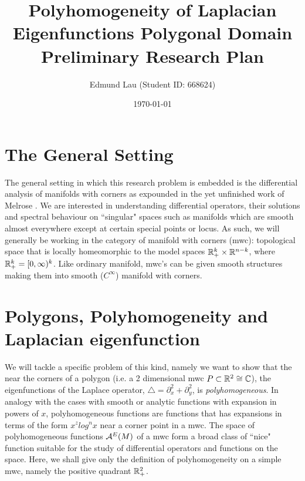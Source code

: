 \documentclass{article}
\title{Polyhomogeneity of Laplacian Eigenfunctions Polygonal Domain \\  Preliminary Research Plan}
\author{Edmund Lau  (Student ID: 668624)}
\date{\today}
\begin{document}
\maketitle



\section{The General Setting}
The general setting in which this research problem is embedded is the differential analysis of manifolds with corners as expounded in the yet unfinished work of Melrose \cite{rbm_daomwc}. We are interested in understanding differential operators, their solutions and spectral behaviour on ``singular" spaces such as manifolds which are smooth almost everywhere except at certain special points or locus. As such, we will generally be working in the category of manifold with corners (mwc): topological space that is locally homeomorphic to the model spaces $\mathbb R_+^{k} \times \mathbb R^{n - k}$, where $\mathbb R_+^k = [0, \infty)^k$. Like ordinary manifold, mwc's can be given smooth structures making them into smooth ($C^\infty$) manifold with corners. 

\section{Polygons, Polyhomogeneity and Laplacian eigenfunction}
We will tackle a specific problem of this kind, namely we want to show that the near the corners of a polygon (i.e. a 2 dimensional mwc $P \subset \mathbb R^2 \cong \mathbb C$), the eigenfunctions of the Laplace operator, $\triangle = \partial_x^2 + \partial_y^2$, is \emph{polyhomogeneous}. In analogy with the cases with smooth or analytic functions with expansion in powers of $x$, polyhomogeneous functions are functions that has expansions in terms of the form $x^z log^nx$  near a corner point in a mwc. The space of polyhomogeneous functions ${\cal A}^E(M)$ of a mwc form a broad class of ``nice" function suitable for the study of differential operators and functions on the space. Here, we shall give only the definition of polyhomogeneity on a simple mwc, namely the positive quadrant $\mathbb R_+^2$. 
\end{document}
